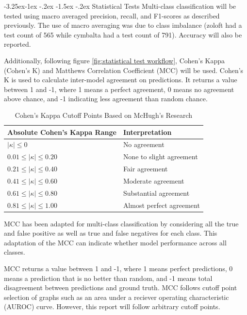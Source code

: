 \documentclass[10.7pt, onecolumn]{article}
\makeatletter
\renewcommand\subsubsection{\@startsection{subsubsection}{3}{\z@}%
	{-3.25ex\@plus -1ex \@minus -.2ex}%
    {-1.5ex \@plus -.2ex}%
    {\normalfont\itshape}}
\makeatother
\begin{document}
\subsubsection{Statistical Tests}
Multi-class classification will be tested using macro averaged precision, recall, and F1-scores as described previously. The use of macro averaging was due to class imbalance (zoloft had a test count of 565 while cymbalta had a test count of 791). Accuracy will also be reported.

Additionally, following figure \ref{fig:statistical test workflow}, Cohen's Kappa\cite{d4} (Cohen's K) and Matthews Correlation Coefficient (MCC) will be used. Cohen's K is used to calculate inter-model agreement on predictions. It returns a value between 1 and -1, where 1 means a perfect agreement, 0 means no agreement above chance, and -1 indicating less agreement than random chance.

\begin{table}[H]
  \centering
  \small
  \begin{tabular}{|p{4cm}|p{3cm}|}
    \hline
    \textbf{Absolute Cohen's Kappa Range} & \textbf{Interpretation} \\
    \hline
    $|\kappa| \leq 0$ & No agreement \\
    \hline
    $0.01 \leq |\kappa| \leq 0.20$ & None to slight agreement \\
    \hline
    $0.21 \leq |\kappa| \leq 0.40$ & Fair agreement \\
    \hline
    $0.41 \leq |\kappa| \leq 0.60$ & Moderate agreement \\
    \hline
    $0.61 \leq |\kappa| \leq 0.80$ & Substantial agreement \\
    \hline
    $0.81 \leq |\kappa| \leq 1.00$ & Almost perfect agreement \\
    \hline
  \end{tabular}
  \caption{Cohen's Kappa Cutoff Points Based on McHugh's Research \cite{cohen}}
  \label{tab:kappaInterpretation}
\end{table}

MCC has been adapted for multi-class classification by considering all the true and false positive as well as true and false negatives for each class\cite{mccmulticlass}. This adaptation of the MCC can indicate whether model performance across all classes.

MCC returns a value between 1 and -1, where 1 means perfect predictions, 0 means a prediction that is no better than random, and -1 means total disagreement between predictions and ground truth. MCC follows cutoff point selection of graphs such as an area under a reciever operating characteristic (AUROC) curve\cite{articlesss}\cite{Yang_Berdine_2017}. However, this report will follow arbitrary cutoff points.
\end{document}
